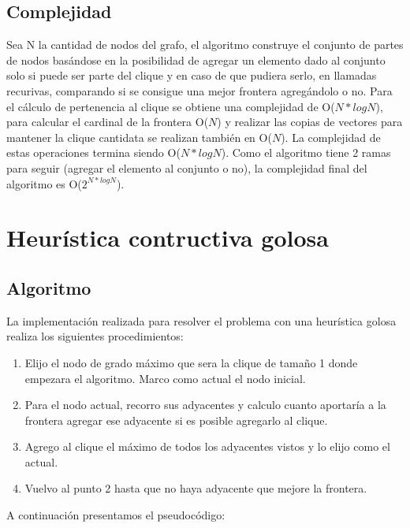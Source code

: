 \documentclass[a4paper, 10pt, twoside]{article}
\begin{document}
\subsection{Complejidad}
Sea N la cantidad de nodos del grafo, el algoritmo construye el conjunto de partes de nodos basándose en la posibilidad de agregar un elemento dado al conjunto solo si puede ser parte del clique y en caso de que pudiera serlo, en llamadas recurivas, comparando si se consigue una mejor frontera agregándolo o no. Para el cálculo de pertenencia al clique se obtiene una complejidad de O($N * log N$), para calcular el cardinal de la frontera O($N$) y realizar las copias de vectores para mantener la clique cantidata se realizan también en O($N$). La complejidad de estas operaciones termina siendo O($N * log N$). Como el algoritmo tiene 2 ramas para seguir (agregar el elemento al conjunto o no), la complejidad final del algoritmo es O($2^{N * log N}$).



\newpage

\section{Heurística contructiva golosa}
\subsection{Algoritmo}
La implementación realizada para resolver el problema con una heurística golosa realiza los siguientes procedimientos:
\begin{enumerate}
\item Elijo el nodo de grado máximo que sera la clique de tamaño 1 donde empezara el algoritmo. Marco como actual el nodo inicial.
\item Para el nodo actual, recorro sus adyacentes y calculo cuanto aportaría a la frontera agregar ese adyacente si es posible agregarlo al clique.
\item Agrego al clique el máximo de todos los adyacentes vistos y lo elijo como el actual.
\item Vuelvo al punto 2 hasta que no haya adyacente que mejore la frontera.
\end{enumerate}

A continuación presentamos el pseudocódigo:
\end{document}
